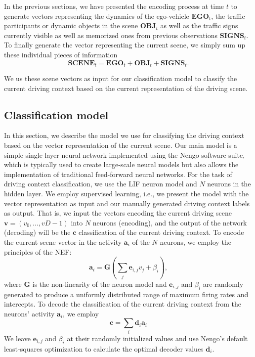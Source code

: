 In the previous sections, we have presented the encoding process at time $t$ to generate vectors representing the dynamics of the ego-vehicle $ \mathbf{EGO}_{t}$, the traffic participants or dynamic objects in the scene $ \mathbf{OBJ}_{t}$ as well as the traffic signs currently visible as well as memorized ones from previous observations $ \mathbf{SIGNS}_{t}$.
To finally generate the vector representing the current scene, we simply sum up these individual pieces of information
\begin{equation}
\label{eq:context_class_scene_vec}
\mathbf{SCENE}_{t} = \mathbf{EGO}_t + \mathbf{OBJ}_t + \mathbf{SIGNS}_t.
\end{equation}

We us these scene vectors as input for our classification model to classify the current driving context based on the current representation of the driving scene.

\subsection{Classification model}%
\label{subsec:classification_model}

In this section, we describe the model we use for classifying the driving context based on the vector representation of the current scene.
Our main model is a simple single-layer neural network implemented using the \ac{Nengo} \parencite{Bekolay2014} software suite, which is typically used to create large-scale neural models \parencite{Eliasmith2013} but also allows the implementation of traditional feed-forward neural networks.
For the task of driving context classification, we use the \ac{LIF} neuron model and $N$ neurons in the hidden layer.
We employ supervised learning, i.e., we present the model with the vector representation as input and our manually generated driving context labels as output.
That is, we input the vectors encoding the current driving scene $\mathbf{v} = \left(v_{0}, \ldots, v{D-1}\right)$ into $N$ neurons (encoding), and the output of the network (decoding) will be the $\mathbf{c}$ classification of the current driving context.
To encode the current scene vector in the activity $ \mathbf{a}_{i}$ of the $N$ neurons, we employ the principles of the \ac{NEF}:
\begin{equation}
  \mathbf{a}_{i} = \mathbf{G} \left(\sum_{j} \mathbf{e}_{i,j} v_j+\beta_i\right),
  \label{eq:context_class_encoding}
\end{equation}
where $ \mathbf{G}$ is the non-linearity of the neuron model and $\mathbf{e}_{i,j}$ and $\beta_i$ are randomly generated to produce a uniformly distributed range of maximum firing rates and intercepts.
To decode the classification of the current driving context from the neurons' activity $ \mathbf{a}_{i}$, we employ
\begin{equation}
  \mathbf{c} = \sum_{i} \mathbf{d}_{i}\mathbf{a}_i
  \label{eq:context_class_decoding}
\end{equation}
We leave $\mathbf{e}_{i,j}$ and $\beta_i$ at their randomly initialized values and use \ac{Nengo}'s default least-squares optimization to calculate the optimal decoder values $ \mathbf{d}_{i}$.

